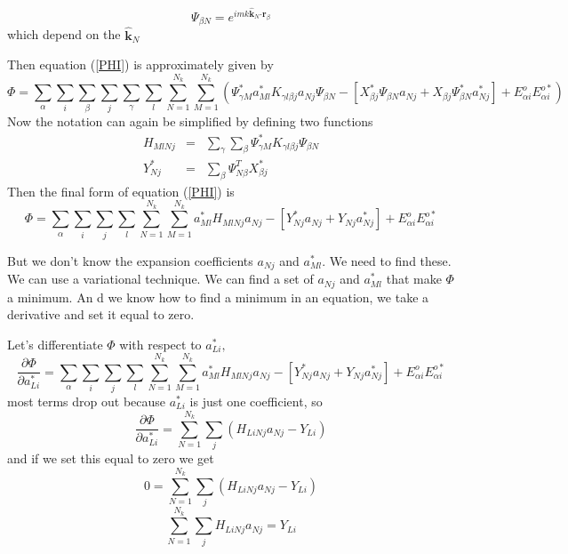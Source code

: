 \documentclass{article}
\begin{document}
\begin{equation}
\Psi _{\beta N}=e^{imk\mathbf{\hat{k}}_{N}\mathbf{\cdot r}_{\beta }}
\end{equation}%
which depend on the $\mathbf{\hat{k}}_{N}$

Then equation (\ref{PHI}) is approximately given by 
\begin{equation}
\Phi =\sum_{\alpha }\sum_{i}\sum_{\beta }\sum_{j}\sum_{\gamma
}\sum_{l}\sum_{N=1}^{N_{k}}\sum_{M=1}^{N_{k}}\left( \Psi _{\gamma M}^{\ast
}a_{Ml}^{\ast }K_{\gamma l\beta j}a_{Nj}\Psi _{\beta N}-\left[ X_{\beta
j}^{\ast }\Psi _{\beta N}a_{Nj}+X_{\beta j}\Psi _{\beta N}^{\ast
}a_{Nj}^{\ast }\right] +E_{\alpha i}^{o}E_{\alpha i}^{o\ast }\right) 
\end{equation}%
Now the notation can again be simplified by defining two functions 
\begin{eqnarray}
H_{MlNj} &=&\sum_{\gamma }\sum_{\beta }\Psi _{\gamma M}^{\ast }K_{\gamma
l\beta j}\Psi _{\beta N} \\
Y_{Nj}^{\ast } &=&\sum_{\beta }\Psi _{N\beta }^{T}X_{\beta j}^{\ast }
\end{eqnarray}%
Then the final form of equation (\ref{PHI}) is 
\begin{equation}
\Phi =\sum_{\alpha
}\sum_{i}\sum_{j}\sum_{l}\sum_{N=1}^{N_{k}}\sum_{M=1}^{N_{k}}a_{Ml}^{\ast
}H_{MlNj}a_{Nj}-\left[ Y_{Nj}^{\ast }a_{Nj}+Y_{Nj}a_{Nj}^{\ast }\right]
+E_{\alpha i}^{o}E_{\alpha i}^{o\ast }  \label{PhiSimp}
\end{equation}

But we don't know the expansion coefficients $a_{Nj}$ and $a_{Ml}^{\ast }.$
We need to find these. We can use a variational technique. We can find a set
of $a_{Nj}$ and $a_{Ml}^{\ast }$ that make $\Phi $ a minimum. An d we know
how to find a minimum in an equation, we take a derivative and set it equal
to zero. 

Let's differentiate $\Phi $ with respect to $a_{Li}^{\ast },$%
\begin{equation*}
\frac{\partial \Phi }{\partial a_{Li}^{\ast }}=\sum_{\alpha
}\sum_{i}\sum_{j}\sum_{l}\sum_{N=1}^{N_{k}}\sum_{M=1}^{N_{k}}a_{Ml}^{\ast
}H_{MlNj}a_{Nj}-\left[ Y_{Nj}^{\ast }a_{Nj}+Y_{Nj}a_{Nj}^{\ast }\right]
+E_{\alpha i}^{o}E_{\alpha i}^{o\ast }
\end{equation*}%
most terms drop out because $a_{Li}^{\ast }$ is just one coefficient, so    
\begin{equation}
\frac{\partial \Phi }{\partial a_{Li}^{\ast }}=\sum_{N=1}^{N_{k}}\sum_{j}%
\left( H_{LiNj}a_{Nj}-Y_{Li}\right)   \label{DerPhi}
\end{equation}%
and if we set this equal to zero we get%
\begin{equation}
0=\sum_{N=1}^{N_{k}}\sum_{j}\left( H_{LiNj}a_{Nj}-Y_{Li}\right) 
\end{equation}%
\begin{equation}
\sum_{N=1}^{N_{k}}\sum_{j}H_{LiNj}a_{Nj}=Y_{Li}
\end{equation}
\end{document}
